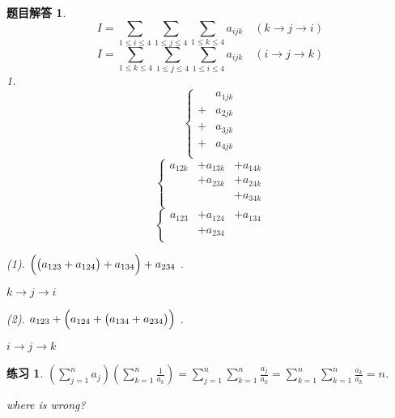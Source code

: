 \documentclass[mode=geye, chinesefont=founder]{elegantnote}
\newtheorem{exercise}{练习}
\newtheorem{answer}{题目解答}
\begin{document}
\begin{answer}
    \begin{equation}
        I = 
        \sum_{1\leqslant i\leqslant 4}
        \sum_{1\leqslant j\leqslant 4}
        \sum_{1\leqslant k\leqslant 4}
        a_{ijk}
        \quad (k\rightarrow j\rightarrow i)
    \end{equation}
    \begin{equation}
        I = 
        \sum_{1\leqslant k\leqslant 4}
        \sum_{1\leqslant j\leqslant 4}
        \sum_{1\leqslant i\leqslant 4}
        a_{ijk}
        \quad (i\rightarrow j\rightarrow k)
    \end{equation}
    1.
    \begin{equation*}
        \left\{
            \begin{array}{ll}
                 & a_{1jk} \\
                +& a_{2jk} \\
                +& a_{3jk} \\
                +& a_{4jk} \\
            \end{array}
        \right.
    \end{equation*}
    \begin{equation*}
        \left\{
            \begin{array}{lll}
                a_{12k} &+ a_{13k} &+ a_{14k} \\
                &+ a_{23k} &+ a_{24k} \\
                &          &+ a_{34k} \\
            \end{array}
        \right.
    \end{equation*}
    \begin{equation*}
        \left\{
            \begin{array}{lll}
                a_{123} &+a_{124} &+a_{134} \\
                &+a_{234}& \\
            \end{array}
        \right.
    \end{equation*}

    (1). $ \Bigl(\bigl(a_{123}+a_{124}\bigr)+a_{134}\Bigr)+a_{234} $ .
    
    $ k\rightarrow j\rightarrow i $ 

    (2). $ a_{123}+\Bigl(a_{124}+\bigl(a_{134}+a_{234}\bigr)\Bigr) $ .
    
    $ i\rightarrow j\rightarrow k $ 
\end{answer}

\begin{exercise}
    $\left( \sum_{j=1}^{n}a_j \right) \left( \sum_{k=1}^{n}\frac{1}{a_k}\right) = \sum_{j=1}^{n}\sum_{k=1}^{n}\frac{a_j}{a_k} = \sum_{k=1}^{n}\sum_{k=1}^{n}\frac{a_k}{a_k}=n$.

    where is wrong?
\end{exercise}
\end{document}
